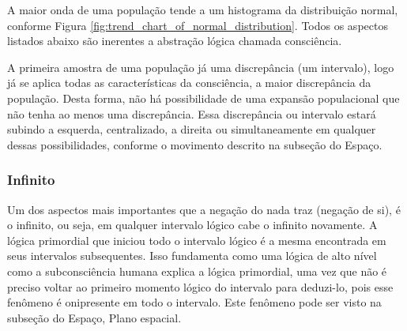 A maior onda de uma população tende a um histograma da distribuição normal, conforme Figura \ref{fig:trend_chart_of_normal_distribution}. Todos os aspectos listados abaixo são inerentes a abstração lógica chamada consciência.

A primeira amostra de uma população já uma discrepância (um intervalo), logo já se aplica todas as características da consciência, a maior discrepância da população. Desta forma, não há possibilidade de uma expansão populacional que não tenha ao menos uma discrepância. Essa discrepância ou intervalo estará subindo a esquerda, centralizado, a direita ou simultaneamente em qualquer dessas possibilidades, conforme o movimento descrito na subseção do Espaço.

\subsubsection{Infinito}
Um dos aspectos mais importantes que a negação do nada traz (negação de si), é o infinito, ou seja, em qualquer intervalo lógico cabe o infinito novamente. A lógica primordial que iniciou todo o intervalo lógico é a mesma encontrada em seus intervalos subsequentes. Isso fundamenta como uma lógica de alto nível como a subconsciência humana explica a lógica primordial, uma vez que não é preciso voltar ao primeiro momento lógico do intervalo para deduzi-lo, pois esse fenômeno é onipresente em todo o intervalo. Este fenômeno pode ser visto na subseção do Espaço, Plano espacial.

